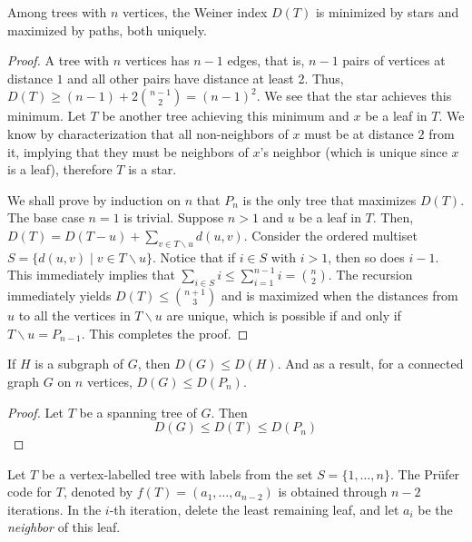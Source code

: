 \begin{theorem}
    Among trees with $n$ vertices, the Weiner index $D(T)$ is minimized by stars and maximized by paths, both uniquely.
\end{theorem}
\begin{proof}
    A tree with $n$ vertices has $n - 1$ edges, that is, $n - 1$ pairs of vertices at distance $1$ and all other pairs have distance at least 2. Thus, $D(T)\ge (n - 1) + 2\binom{n - 1}{2} = (n - 1)^2$. We see that the star achieves this minimum. Let $T$ be another tree achieving this minimum and $x$ be a leaf in $T$. We know by characterization that all non-neighbors of $x$ must be at distance $2$ from it, implying that they must be neighbors of $x$'s neighbor (which is unique since $x$ is a leaf), therefore $T$ is a star.

    We shall prove by induction on $n$ that $P_n$ is the only tree that maximizes $D(T)$. The base case $n = 1$ is trivial. Suppose $n > 1$ and $u$ be a leaf in $T$. Then, $D(T) = D(T - u) + \sum_{v\in T\backslash u} d(u, v)$. Consider the ordered multiset $S = \{d(u,v)\mid v\in T\backslash u\}$. Notice that if $i\in S$ with $i > 1$, then so does $i - 1$. This immediately implies that $\sum_{i\in S}i\le\sum_{i=1}^{n - 1}i = \binom{n}{2}$. The recursion immediately yields $D(T)\le\binom{n + 1}{3}$ and is maximized when the distances from $u$ to all the vertices in $T\backslash u$ are unique, which is possible if and only if $T\backslash u = P_{n - 1}$. This completes the proof.
\end{proof}

\begin{lemma}
    If $H$ is a subgraph of $G$, then $D(G)\le D(H)$. And as a result, for a connected graph $G$ on $n$ vertices, $D(G)\le D(P_n)$.
\end{lemma}
\begin{proof}
    Let $T$ be a spanning tree of $G$. Then 
    \begin{equation*}
        D(G) \le D(T) \le D(P_n)
    \end{equation*}
\end{proof}

\begin{definition}
    Let $T$ be a vertex-labelled tree with labels from the set $S = \{1,\ldots,n\}$. The Pr\"ufer code for $T$, denoted by $f(T) = (a_1,\ldots,a_{n-2})$ is obtained through $n - 2$ iterations. In the $i$-th iteration, delete the least remaining leaf, and let $a_i$ be the \textit{neighbor} of this leaf.
\end{definition}

